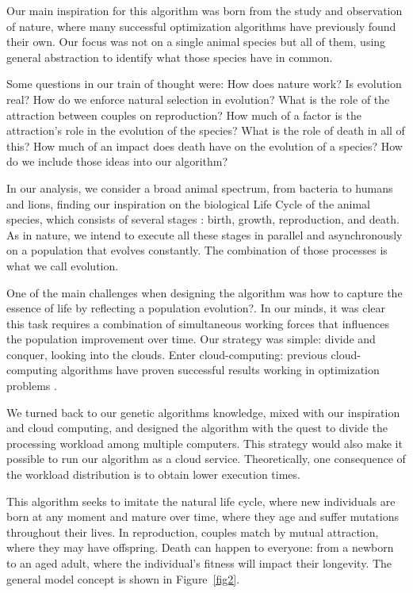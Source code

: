 \documentclass[runningheads]{llncs}
\begin{document}
Our main inspiration for this algorithm was born from the study and observation
of nature, where many successful optimization algorithms have previously found
their own. Our focus was not on a single animal species but all of them, using
general abstraction to identify what those species have in common. 

Some questions in our train of thought were: How does nature work? Is evolution
real? How do we enforce natural selection in evolution? What is the role of the
attraction between couples on reproduction? How much of a factor is the
attraction's role in the evolution of the species? What is the role of death in
all of this? How much of an impact does death have on the evolution of a
species? How do we include those ideas into our algorithm?

In our analysis, we consider a broad animal spectrum, from bacteria to humans
and lions, finding our inspiration on the biological Life Cycle of the animal
species, which consists of several stages \cite{read1968system}: birth, growth,
reproduction, and death. As in nature, we intend to execute all these stages in
parallel and asynchronously on a population that evolves constantly. The
combination of those processes is what we call evolution.

One of the main challenges when designing the algorithm was how to capture the
essence of life by reflecting a population evolution?. In our minds, it was
clear this task requires a combination of simultaneous working forces that
influences the population improvement over time. Our strategy was simple:
divide and conquer, looking into the clouds. Enter cloud-computing: previous
cloud-computing algorithms have proven successful results working in
optimization problems \cite{garcia2021event}.

We turned back to our genetic algorithms knowledge, mixed with our inspiration
and cloud computing, and designed the algorithm with the quest to divide the
processing workload among multiple computers. This strategy would also make it
possible to run our algorithm as a cloud service. Theoretically, one
consequence of the workload distribution is to obtain lower execution times.

This algorithm seeks to imitate the natural life cycle, where new individuals
are born at any moment and mature over time, where they age and suffer
mutations throughout their lives. In reproduction, couples match by mutual
attraction, where they may have offspring. Death can happen to everyone: from a
newborn to an aged adult, where the individual's fitness will impact their
longevity. The general model concept is shown in Figure~\ref{fig2}.
\end{document}
